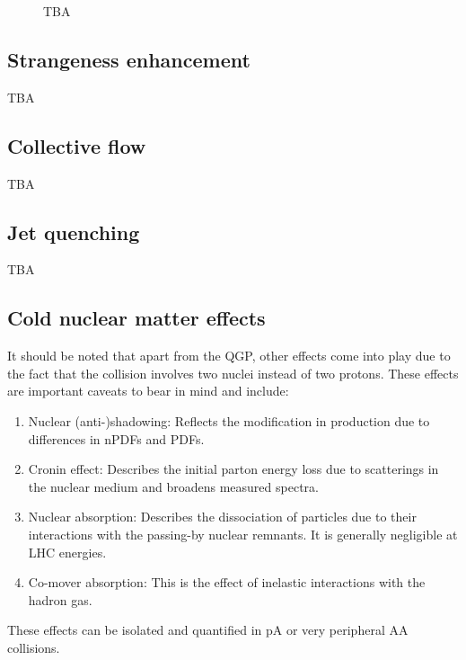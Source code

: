 \begin{figure}[H]
\caption{TBA}
\label{fig:colls:cmsupsilon}
\end{figure}

\subsection{Strangeness enhancement}

TBA

\subsection{Collective flow}

TBA

\subsection{Jet quenching}

TBA

\subsection{Cold nuclear matter effects}

It should be noted that apart from the QGP, other effects come into play due to the fact that the collision involves two nuclei instead of two protons. These effects are important caveats to bear in mind and include:

\begin{enumerate}
\item Nuclear (anti-)shadowing: Reflects the modification in production due to differences in nPDFs and PDFs.
\item Cronin effect: Describes the initial parton energy loss due to scatterings in the nuclear medium and broadens measured \pt spectra.
\item Nuclear absorption: Describes the dissociation of particles due to their interactions with the passing-by nuclear remnants. It is generally negligible at LHC energies.
\item Co-mover absorption: This is the effect of inelastic interactions with the hadron gas.
\end{enumerate}

These effects can be isolated and quantified in pA or very peripheral AA collisions.

